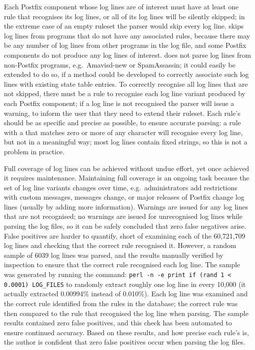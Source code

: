Each Postfix component whose log lines are of interest must have at least
one rule that recognises its log lines, or all of its log lines will be
silently skipped; in the extreme case of an empty ruleset the parser would
skip every log line.  \parsername{} skips log lines from programs that do
not have any associated rules, because there may be any number of log lines
from other programs in the log file, and some Postfix components do not
produce any log lines of interest.  \parsername{} does not parse log lines
from non-Postfix programs, e.g.\ Amavisd-new or SpamAssassin; it could
easily be extended to do so, if a method could be developed to correctly
associate such log lines with existing state table entries.  To correctly
recognise all log lines that are not skipped, there must be a rule to
recognise each log line variant produced by each Postfix component; if a
log line is not recognised the parser will issue a warning, to inform the
user that they need to extend their ruleset.  Each rule's 
should be as specific and precise as possible, to ensure accurate parsing:
a rule with a  that matches zero or more of any character
will recognise every log line, but not in a meaningful way; most log lines
contain fixed strings, so this is not a problem in practice.

Full coverage of log lines can be achieved without undue effort, yet once
achieved it requires maintenance.  Maintaining full coverage is an ongoing
task because the set of log line variants changes over time, e.g.\
administrators add restrictions with custom messages, 
messages change, or major releases of Postfix change log lines (usually by
adding more information).  Warnings are issued for any log lines that are
not recognised; no warnings are issued for unrecognised log lines while
parsing the \numberOFlogFILES{} log files, so it can be safely concluded
that zero false negatives arise.  False positives are harder to quantify,
short of examining each of the 60,721,709 log lines and checking that the
correct rule recognised it.  However, a random sample of 6039 log lines was
parsed, and the results manually verified by inspection to ensure that the
correct rule recognised each log line.  The sample was generated by running
the command: \newline{} \tab{} \texttt{perl -n -e \singlequote{}print if
(rand 1 < 0.0001)\singlequote{} LOG\_FILES} \newline{} to randomly extract
roughly one log line in every 10,000 (it actually extracted 0.00994\%
instead of 0.010\%).  Each log line was examined and the correct rule
identified from the \numberOFrules{} rules in the database; the correct
rule was then compared to the rule that recognised the log line when
parsing.  The sample results contained zero false positives, and this check
has been automated to ensure continued accuracy.  Based on these results,
and how precise each rule's \acronym{regex} is, the author is confident
that zero false positives occur when parsing the \numberOFlogFILES{} log
files.

